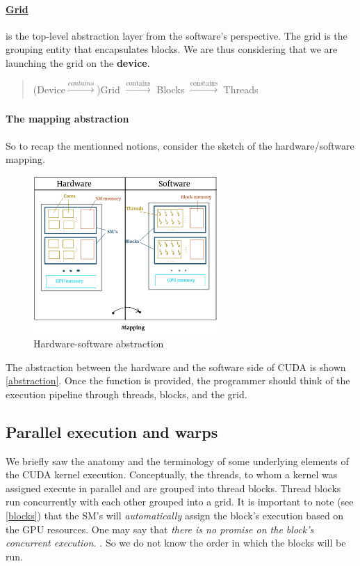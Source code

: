 \documentclass[12pt]{article}
\begin{document}
\vspace{-15pt}
\paragraph{\underline{Grid}} is the top-level abstraction layer from the software's perspective. The grid
is the grouping entity that encapsulates blocks. We are thus considering that we are launching 
the grid on the \textbf{device}.
\begin{quote}
   \centering
    (Device$\xrightarrow[]{contains}$)Grid $\xrightarrow[]{\text{contains}}$ Blocks $\xrightarrow[]{\text{constains}}$ Threads
\end{quote}

\vspace{-18pt}
\paragraph{The mapping abstraction} So to recap the mentionned notions, consider the 
sketch of the hardware/software mapping.

\begin{figure}
      \vspace{-10pt}
      \centering
       \includegraphics[height=6cm]{pngs/hard_soft.png}
   \caption{Hardware-software abstraction}
   \label{abstraction}
\end{figure}
The abstraction between the hardware and the software side of CUDA is shown \autoref{abstraction}. Once the function 
is provided, the programmer should think of the execution pipeline through threads, blocks, and the grid.

\clearpage
\newpage
\subsection{Parallel execution and warps}
\label{warps}
We briefly saw the anatomy and the terminology of some underlying elements of the CUDA kernel execution.
Conceptually, the threads, to whom a kernel was assigned execute in parallel and are grouped into thread blocks.
Thread blocks run concurrently with each other grouped into a grid. It is important to note (see \autoref{blocks}) that 
the SM's will \textit{automatically} assign the block's execution based on the GPU resources. One may say that 
\textsl{
there is no promise on the block's concurrent execution.
}. So we do not know the order in which the blocks will be run.
\end{document}
